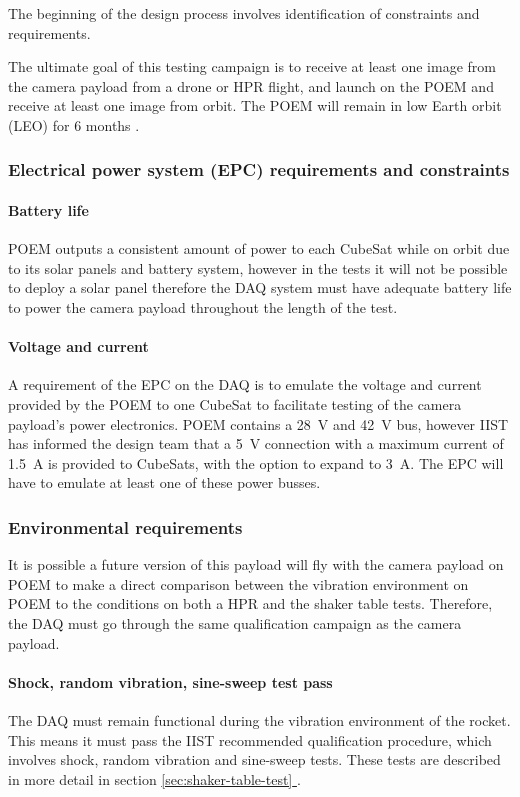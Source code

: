 \documentclass[a4paper,11pt]{article}
\newcommand*{\fullref}[1]{\hyperref[{#1}]{\ref*{#1} \nameref*{#1}}}
\begin{document}
The beginning of the design process involves identification of constraints and requirements.

The ultimate goal of this testing campaign is to receive at least one image from the camera payload from a drone or HPR flight, and launch on the POEM and receive at least one image from orbit. The POEM will remain in low Earth orbit (LEO) for 6 months \cite{jagdale2023sanket}.

\subsubsection{Electrical power system (EPC) requirements and constraints}
\paragraph{Battery life} POEM outputs a consistent amount of power to each CubeSat while on orbit due to its solar panels and battery system, however in the tests it will not be possible to deploy a solar panel therefore the DAQ system must have adequate battery life to power the camera payload throughout the length of the test.
\paragraph{Voltage and current} A requirement of the EPC on the DAQ is to emulate the voltage and current provided by the POEM to one CubeSat to facilitate testing of the camera payload's power electronics. POEM contains a \SI{28}{\volt} and \SI{42}{\volt} bus, however IIST has informed the design team that a \SI{5}{\volt} connection with a maximum current of \SI{1.5}{\ampere} is provided to CubeSats, with the option to expand to \SI{3}{\ampere}. The EPC will have to emulate at least one of these power busses.

\subsubsection{Environmental requirements}
It is possible a future version of this payload will fly with the camera payload on POEM to make a direct comparison between the vibration environment on POEM to the conditions on both a HPR and the shaker table tests. Therefore, the DAQ must go through the same qualification campaign as the camera payload.

\paragraph{Shock, random vibration, sine-sweep test pass} The DAQ must remain functional during the vibration environment of the rocket. This means it must pass the IIST recommended qualification procedure, which involves shock, random vibration and sine-sweep tests. These tests are described in more detail in section \fullref{sec:shaker-table-test}.
\end{document}
